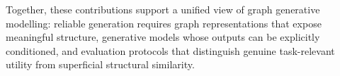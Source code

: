 Together, these contributions support a unified view of graph generative
modelling: reliable generation requires graph representations that expose
meaningful structure, generative models whose outputs can be explicitly
conditioned, and evaluation protocols that distinguish genuine task-relevant
utility from superficial structural similarity.
